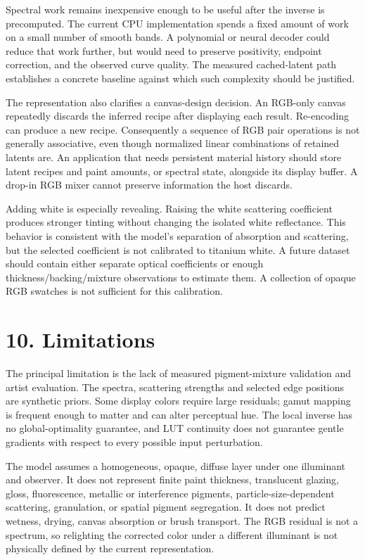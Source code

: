 \documentclass[
  10pt,
  twocolumn]{article}
\begin{document}
Spectral work remains inexpensive enough to be useful after the inverse
is precomputed. The current CPU implementation spends a fixed amount of
work on a small number of smooth bands. A polynomial or neural decoder
could reduce that work further, but would need to preserve positivity,
endpoint correction, and the observed curve quality. The measured
cached-latent path establishes a concrete baseline against which such
complexity should be justified.

The representation also clarifies a canvas-design decision. An RGB-only
canvas repeatedly discards the inferred recipe after displaying each
result. Re-encoding can produce a new recipe. Consequently a sequence of
RGB pair operations is not generally associative, even though normalized
linear combinations of retained latents are. An application that needs
persistent material history should store latent recipes and paint
amounts, or spectral state, alongside its display buffer. A drop-in RGB
mixer cannot preserve information the host discards.

Adding white is especially revealing. Raising the white scattering
coefficient produces stronger tinting without changing the isolated
white reflectance. This behavior is consistent with the model's
separation of absorption and scattering, but the selected coefficient is
not calibrated to titanium white. A future dataset should contain either
separate optical coefficients or enough thickness/backing/mixture
observations to estimate them. A collection of opaque RGB swatches is
not sufficient for this calibration.

\hypertarget{limitations}{%
\section{10. Limitations}\label{limitations}}

The principal limitation is the lack of measured pigment-mixture
validation and artist evaluation. The spectra, scattering strengths and
selected edge positions are synthetic priors. Some display colors
require large residuals; gamut mapping is frequent enough to matter and
can alter perceptual hue. The local inverse has no global-optimality
guarantee, and LUT continuity does not guarantee gentle gradients with
respect to every possible input perturbation.

The model assumes a homogeneous, opaque, diffuse layer under one
illuminant and observer. It does not represent finite paint thickness,
translucent glazing, gloss, fluorescence, metallic or interference
pigments, particle-size-dependent scattering, granulation, or spatial
pigment segregation. It does not predict wetness, drying, canvas
absorption or brush transport. The RGB residual is not a spectrum, so
relighting the corrected color under a different illuminant is not
physically defined by the current representation.
\end{document}
